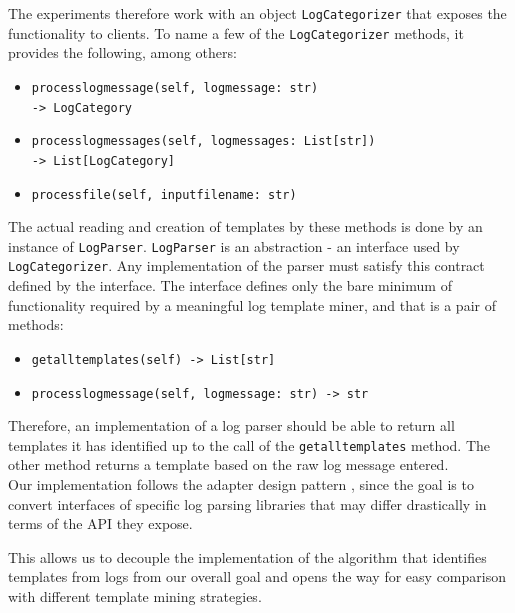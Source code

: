 The experiments therefore work with an object \texttt{LogCategorizer} that exposes the functionality to clients. To name a few of the \texttt{LogCategorizer} methods, it provides the following, among others:

\begin{itemize}
    \item \texttt{process\textunderscore log\textunderscore message(self, log\textunderscore message: str)\\ -> LogCategory}
    \item \texttt{process\textunderscore log\textunderscore messages(self, log\textunderscore messages: List[str])\\ -> List[LogCategory]}
    \item \texttt{process\textunderscore file(self, input\textunderscore file\textunderscore name: str)}
\end{itemize}

The actual reading and creation of templates by these methods is done by an instance of \texttt{LogParser}. \texttt{LogParser} is an abstraction - an interface used by \texttt{LogCategorizer}. Any implementation of the parser must satisfy this contract defined by the interface. The interface defines only the bare minimum of functionality required by a meaningful log template miner, and that is a pair of methods:
\begin{itemize}
    \item \texttt{get\textunderscore all\textunderscore templates(self) -> List[str]}
    \item \texttt{process\textunderscore log\textunderscore message(self, log\textunderscore message: str) -> str}
\end{itemize}
Therefore, an implementation of a log parser should be able to return all templates it has identified up to the call of the \texttt{get\textunderscore all\textunderscore templates} method. The other method returns a template based on the raw log message entered.\\

Our implementation follows the adapter design pattern \cite{gamma1995design_pattern_adapter}, since the goal is to convert interfaces of specific log parsing libraries that may differ drastically in terms of the API they expose.

This allows us to decouple the implementation of the algorithm that identifies templates from logs from our overall goal and opens the way for easy comparison with different template mining strategies.\\


